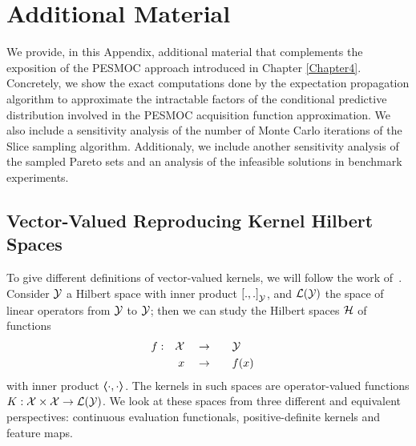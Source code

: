 
\chapter{Additional Material}
\label{AppendixB}

We provide, in this Appendix, additional material that complements the exposition of the PESMOC approach introduced in Chapter \ref{Chapter4}. Concretely, we show the exact computations done by the expectation propagation algorithm to approximate the intractable factors of the conditional predictive distribution involved in the PESMOC acquisition function approximation. We also include a sensitivity analysis of the number of Monte Carlo iterations of the Slice sampling algorithm. Additionaly, we include another sensitivity analysis of the sampled Pareto sets and an analysis of the infeasible solutions in benchmark experiments.


\section{Vector-Valued Reproducing Kernel Hilbert Spaces}%
To give different definitions of vector-valued kernels, we will follow the work of~\citet{MicchelliP05}.
Consider $\mathcal{Y}$ a Hilbert space with inner product $\left[ ., . \right]_\mathcal{Y}$, and $\mathcal{L}(\mathcal{Y})$ the space of linear operators from $\mathcal{Y}$ to $\mathcal{Y}$; then we can study the Hilbert spaces $\mathcal{H}$ of functions
\begin{equation*}
    \begin{aligned}
        f: &  & \mathcal{X} &  &  & \to &  &  &  & \mathcal{Y} &  & \\
           &  & x       &  &  & \to &  &  &  & f(x)    &  &
    \end{aligned}
\end{equation*}
with inner product $\bm{\left\langle} \cdot, \cdot \bm{\right\rangle}$.
The kernels in such spaces are operator-valued functions $K: \mathcal{X} \times \mathcal{X} \to \mathcal{L}(\mathcal{Y})$.
We look at these spaces from three different and equivalent perspectives: continuous evaluation functionals, positive-definite kernels and feature maps.

